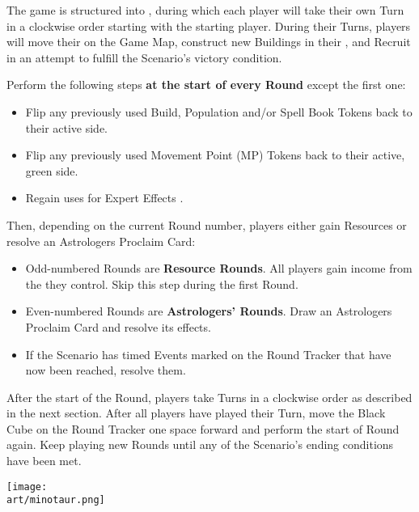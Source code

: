 
\begin{multicols*}{2}

The game is structured into , during which each player will take their own Turn in a clockwise order starting with the starting player.
During their Turns, players will move their  on the Game Map, construct new Buildings in their , and Recruit  in an attempt to fulfill the Scenario's victory condition.\par
Perform the following steps \textbf{at the start of every Round} except the first one:
\begin{itemize}
  \item Flip any previously used Build, Population and/or Spell Book Tokens back to their active side.
  \item Flip any previously used Movement Point (MP) Tokens back to their active, green side.
  \item Regain uses for Expert Effects .
\end{itemize}
Then, depending on the current Round number, players either gain Resources or resolve an Astrologers Proclaim Card:
\begin{itemize}
  \item Odd-numbered Rounds are \textbf{Resource Rounds}.
    All players gain income from the  they control.
    Skip this step during the first Round.
  \item Even-numbered Rounds are \textbf{Astrologers' Rounds}.
    Draw an Astrologers Proclaim Card and resolve its effects.
  \item If the Scenario has timed Events marked on the Round Tracker that have now been reached, resolve them.
\end{itemize}
After the start of the Round, players take Turns in a clockwise order as described in the next section.
After all players have played their Turn, move the Black Cube on the Round Tracker one space forward and perform the start of Round again.
Keep playing new Rounds until any of the Scenario's ending conditions have been met.

\vspace*{\fill}

\hspace{1em}\texttt{[image: \\art/minotaur.png]}

\vspace*{\fill}


\end{multicols*}
